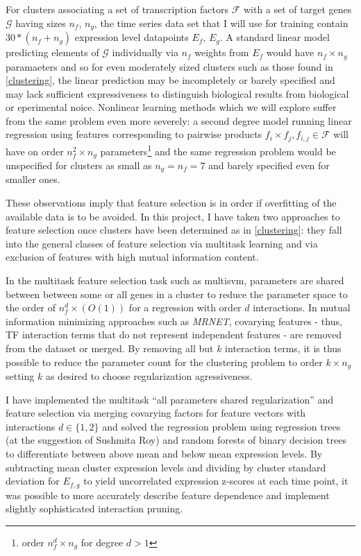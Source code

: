 \documentclass[12pt,a4paper]{article}
\begin{document}
\begin{multicols}{2}
For clusters associating a set of transcription factors $\mathcal{F}$ with a set of target genes $\mathcal{G}$ having sizes $n_f$, $n_g$, the time series data set that I will use for training contain $30*(n_f + n_g)$ expression level datapoints $E_f$, $E_g$. A standard linear model predicting elements of $\mathcal{G}$ individually via $n_f$ weights from $E_f$ would have $n_f\times n_g$ paramaeters and so for even moderately sized clusters such as those found in \ref{clustering}, the linear prediction may be incompletely or barely specified and may lack sufficient expressiveness to distinguish biological results from biological or eperimental noice. Nonlinear learning methods which we will explore suffer from the same problem even more severely: a second degree model running linear regression using features corresponding to pairwise products $f_i \times f_j, f_{i,j} \in \mathcal{F}$ will have on order $n_f^2\times n_g$ parameters\footnote{order $n_f^d \times n_g$ for degree $d>1$} and the same regression problem would be unspecified for clusters as small as $n_g=n_f=7$ and barely specified even for smaller ones.

These observations imply that feature selection is in order if overfitting of the available data is to be avoided. In this project, I have taken two approaches to feature selection once clusters have been determined as in \ref{clustering}: they fall into the general classes of feature selection via multitask learning and via exclusion of features with high mutual information content.

In the multitask feature selection task such as multisvm\cite{RefWorks:28}, parameters are shared between between some or all genes in a cluster to reduce the parameter space to the order of $n_f^d\times (O(1))$ for a regression with order $d$ interactions. In mutual information minimizing approaches such as \textit{MRNET}\cite{RefWorks:29}, covarying features - thus, TF interaction terms that do not represent independent features - are removed from the dataset or merged. By removing all but $k$ interaction terms, it is thus possible to reduce the parameter count for the clustering problem to order $k\times n_g$ setting $k$ as desired to choose regularization agressiveness.

I have implemented the multitask ``all parameters shared regularization'' and feature selection via merging covarying factors for feature vectors with interactions $d \in \{1,2 \}$ and solved the regression problem using regression trees (at the suggestion of Sushmita Roy) and random forests of binary decision trees to differentiate between above mean and below mean expression levels. By subtracting mean cluster expression levels and dividing by cluster standard deviation for $E_{f,g}$ to yield uncorrelated expression z-scores at each time point, it was possible to more accurately describe feature dependence and implement slightly sophisticated interaction pruning.


\end{multicols}
\end{document}
